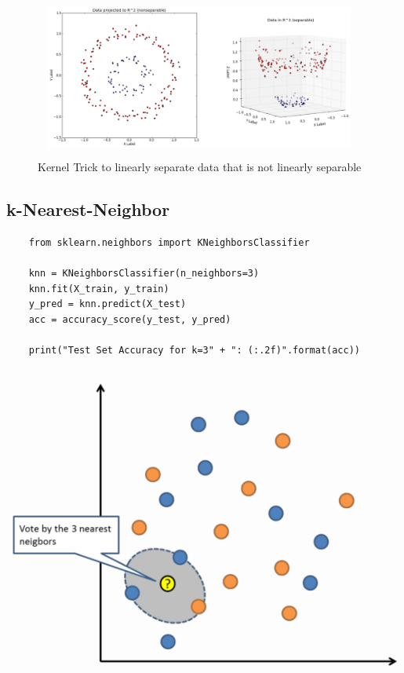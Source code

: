 \documentclass[11pt]{article}
\begin{document}
\begin{figure}[htb!]
    \centering
    \includegraphics[keepaspectratio=true,height=11\baselineskip]{kernel_trick.png}
    \caption{Kernel Trick to linearly separate data that is not linearly separable}
    \label{fig:kernel_trick}
\end{figure}

\subsection{k-Nearest-Neighbor}

\begin{minipage}{0.55\textwidth}
    \begin{lstlisting}
    from sklearn.neighbors import KNeighborsClassifier

    knn = KNeighborsClassifier(n_neighbors=3)
    knn.fit(X_train, y_train)
    y_pred = knn.predict(X_test)
    acc = accuracy_score(y_test, y_pred)

    print("Test Set Accuracy for k=3" + ": (:.2f)".format(acc))
    \end{lstlisting}
\end{minipage}\hfill
\begin{minipage}{0.40\textwidth}
    \centering
    \includegraphics[keepaspectratio=true, width=\textwidth]{knn.png}
\end{minipage}
\end{document}
